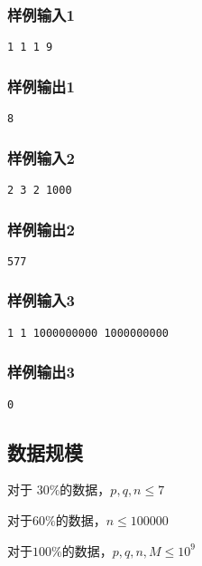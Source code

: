 \documentclass[hyperref,UTF8,12pt,a4paper]{ctexart}
\begin{document}
\subsubsection{样例输入1}

\begin{verbatim}
1 1 1 9
\end{verbatim}

\subsubsection{样例输出1}

\begin{verbatim}
8
\end{verbatim}

\subsubsection{样例输入2}

\begin{verbatim}
2 3 2 1000
\end{verbatim}

\subsubsection{样例输出2}

\begin{verbatim}
577
\end{verbatim}

\subsubsection{样例输入3}

\begin{verbatim}
1 1 1000000000 1000000000 
\end{verbatim}

\subsubsection{样例输出3}

\begin{verbatim}
0 
\end{verbatim}

\subsection{数据规模}

对于 $30\%$的数据，$p, q, n\le 7$

对于$60\%$的数据，$n \le 100000$

对于$100\%$的数据，$p, q, n, M ≤ 10^9$
\end{document}
